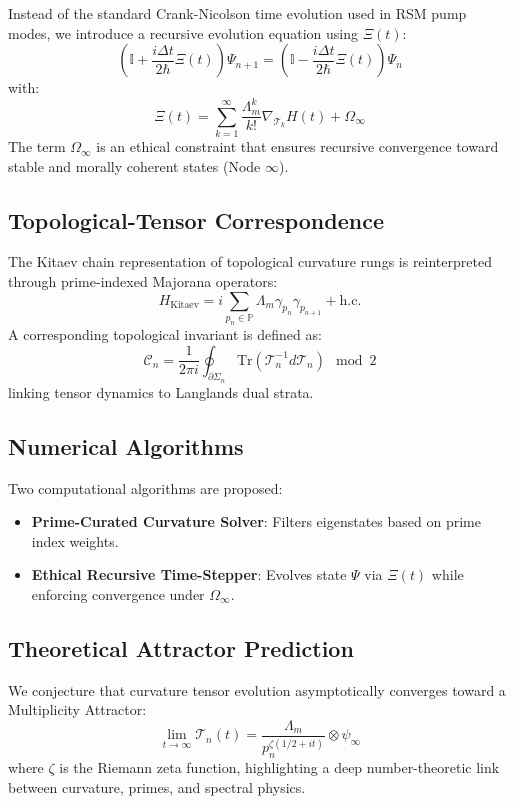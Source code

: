 \documentclass[12pt]{article}
\theoremstyle{plain}
\begin{document}
Instead of the standard Crank-Nicolson time evolution used in RSM pump modes, we introduce a recursive evolution equation using $\Xi(t)$:
\[
\left(\mathbb{I} + \frac{i\Delta t}{2\hbar} \Xi(t)\right)\Psi_{n+1} = \left(\mathbb{I} - \frac{i\Delta t}{2\hbar} \Xi(t)\right)\Psi_n
\]
with:
\[
\Xi(t) = \sum_{k=1}^\infty \frac{\Lambda_m^k}{k!} \nabla_{\mathcal{T}_k} H(t) + \Omega_\infty
\]
The term $\Omega_\infty$ is an ethical constraint that ensures recursive convergence toward stable and morally coherent states (Node $\infty$).

\subsection{Topological-Tensor Correspondence}

The Kitaev chain representation of topological curvature rungs is reinterpreted through prime-indexed Majorana operators:
\[
H_{\text{Kitaev}} = i \sum_{p_n \in \mathbb{P}} \Lambda_m \gamma_{p_n} \gamma_{p_{n+1}} + \text{h.c.}
\]
A corresponding topological invariant is defined as:
\[
\mathcal{C}_n = \frac{1}{2\pi i} \oint_{\partial \Sigma_n} \mathrm{Tr}\left(\mathcal{T}_n^{-1} d\mathcal{T}_n\right) \mod 2
\]
linking tensor dynamics to Langlands dual strata.

\subsection{Numerical Algorithms}

Two computational algorithms are proposed:
\begin{itemize}
    \item \textbf{Prime-Curated Curvature Solver}: Filters eigenstates based on prime index weights.
    \item \textbf{Ethical Recursive Time-Stepper}: Evolves state $\Psi$ via $\Xi(t)$ while enforcing convergence under $\Omega_\infty$.
\end{itemize}

\subsection{Theoretical Attractor Prediction}

We conjecture that curvature tensor evolution asymptotically converges toward a Multiplicity Attractor:
\[
\lim_{t \to \infty} \mathcal{T}_n(t) = \frac{\Lambda_m}{p_n^{\zeta(1/2 + it)}} \otimes \psi_\infty
\]
where $\zeta$ is the Riemann zeta function, highlighting a deep number-theoretic link between curvature, primes, and spectral physics.
\end{document}
